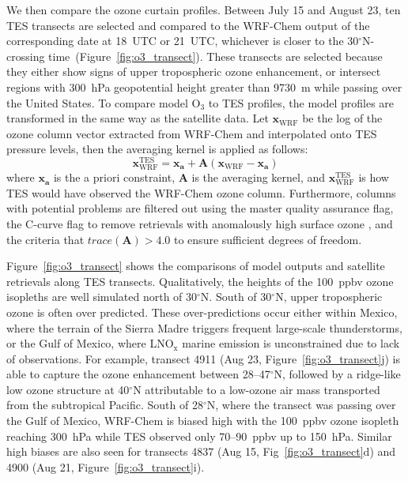 We then compare the ozone curtain profiles. Between July 15 and August 23, ten TES
transects are selected and compared to the WRF-Chem output of the corresponding
date at 18~UTC or 21~UTC, whichever is closer to the 30$^\circ$N-crossing
time~(Figure~\ref{fig:o3_transect}). These transects are selected because they either show
signs of upper tropospheric ozone enhancement, or intersect regions with 300~hPa
geopotential height greater than 9730~m  while passing over the United States.
To compare model O$_3$ to TES profiles, the model profiles are transformed in
the same way as the satellite data. Let $\mathbf{x}_{\mathrm{WRF}}$ be the log of the ozone column
vector extracted from WRF-Chem and interpolated onto TES pressure levels, then the
averaging kernel is applied as follows:
	\begin{equation}\label{eqn:TES-AK}
		\mathbf{x}_{\mathrm{WRF}}^{\mathrm{TES}} = \mathbf{x_a} +
		\mathbf{A}\left(\mathbf{x}_{\mathrm{WRF}}-\mathbf{x_a}\right)
	\end{equation}
where $\mathbf{x_a}$ is the a priori constraint, $\mathbf{A}$ is the averaging kernel,
and $\mathbf{x}_{\mathrm{WRF}}^{\mathrm{TES}}$ is how TES would have observed the
WRF-Chem ozone column. Furthermore, columns with potential problems are filtered
out using the master quality assurance flag, the C-curve flag to remove retrievals with
anomalously high surface ozone \citep{Zhang:2010fk}, and the criteria that
$trace(\mathbf{A})>4.0$ to ensure sufficient degrees of freedom.

Figure~\ref{fig:o3_transect} shows the comparisons of model outputs and satellite retrievals along TES transects.
Qualitatively, the heights of the 100~ppbv ozone isopleths are well simulated north of
30$^\circ$N. South of 30$^\circ$N, upper tropospheric ozone is often over predicted.
These over-predictions occur either within Mexico, where the terrain of the Sierra Madre
triggers frequent large-scale thunderstorms, or the Gulf of Mexico, where LNO$_{\mathrm{x}}$
marine emission is unconstrained due to lack of observations. For example, transect 4911 (Aug 23, Figure~\ref{fig:o3_transect}j)
is able to capture the ozone enhancement between 28--47$^\circ$N, followed by a
ridge-like low ozone structure at 40$^\circ$N attributable to a low-ozone air mass
transported from the subtropical Pacific. South of 28$^\circ$N, where the transect
was passing over the Gulf of Mexico, WRF-Chem is biased high with the 100~ppbv
ozone isopleth reaching 300~hPa while TES observed only 70--90~ppbv up to 150~hPa.
Similar high biases are also seen for transects 4837 (Aug 15, Fig~\ref{fig:o3_transect}d)
and 4900 (Aug 21, Figure~\ref{fig:o3_transect}i).

